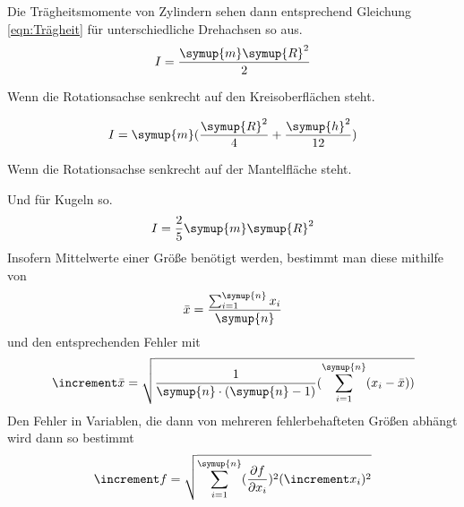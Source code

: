 Die Trägheitsmomente von Zylindern sehen dann entsprechend Gleichung \ref{eqn:Trägheit} für unterschiedliche
Drehachsen so aus.
\begin{equation}
    I=\frac{\symup{m}\symup{R}^2}{2} 
    \label{eqn:Trägheit_Zyl_1} 
\end{equation}
    \begin{center} 
    Wenn die Rotationsachse senkrecht auf den Kreisoberflächen steht.
    \end{center}
\begin{equation}
    I=\symup{m} (\frac{\symup{R}^2}{4}+\frac{\symup{h}^2}{12}) 
    \label{eqn:Trägheit_Zyl_2}  
\end{equation}
\begin{center}   
    Wenn die Rotationsachse senkrecht auf der Mantelfläche steht.
\end{center}

Und für Kugeln so.
\begin{equation}
    I=\frac{2}{5}\symup{m}\symup{R}^2
    \label{eqn:Trägheit_Kugel}
\end{equation}
Insofern Mittelwerte einer Größe benötigt werden, bestimmt man diese mithilfe von
\begin{equation}
    \bar{x}=\frac{\sum_{i=1}^{\symup{n}} x_i}{\symup{n}}
    \label{eqn:MW}
\end{equation}
und den entsprechenden Fehler mit
\begin{equation}
    \increment\bar{x}=\sqrt{\frac{1}{\symup{n}\cdot(\symup{n}-1)}(\sum_{i=1}^{\symup{n}} (x_i - \bar{x}))}
\end{equation}
Den Fehler in Variablen, die dann von mehreren fehlerbehafteten Größen abhängt wird dann so bestimmt
\begin{equation}
    \increment f=\sqrt{\sum_{i=1}^{\symup{n}} (\frac{\partial f}{\partial x_i})^2 (\increment x_i)^2}
\end{equation}
